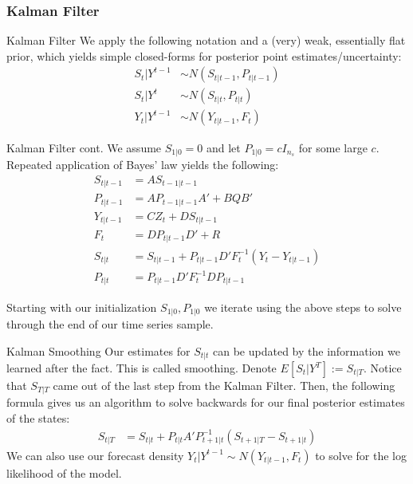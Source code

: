 \documentclass{beamer}
\begin{document}
\subsubsection*{Kalman Filter}
\begin{frame}{Kalman Filter}
We apply the following notation and a (very) weak, essentially flat prior, which yields simple closed-forms for posterior point estimates/uncertainty:
\begin{align*}
S_t|Y^{t-1} &\sim N(S_{t|t-1},P_{t|t-1}) \\
S_t|Y^{t} &\sim N(S_{t|t},P_{t|t})\\
Y_t|Y^{t-1} &\sim N(Y_{t|t-1},F_{t})
\end{align*}
\end{frame}
\begin{frame}{Kalman Filter cont.}
We assume $S_{1|0} = 0$ and let $P_{1|0} = cI_{n_s}$ for some large $c$. Repeated application of Bayes' law yields the following:
\begin{align*}
S_{t|t-1} &= AS_{t-1|t-1} \\
P_{t|t-1} &= A P_{t-1|t-1}A' + B Q B' \\
Y_{t|t-1} &= CZ_t + D S_{t|t-1} \\
F_t &= D P_{t|t-1}D' + R \\
S_{t|t} &= S_{t|t-1} + P_{t|t-1}D'F_t^{-1}(Y_t - Y_{t|t-1})\\
P_{t|t} &= P_{t|t-1}D'F_t^{-1}DP_{t|t-1}
\end{align*}

Starting with our initialization $S_{1|0},P_{1|0}$ we iterate using the above steps to solve through the end of our time series sample.
\end{frame}
\begin{frame}{Kalman Smoothing}
Our estimates for $S_{t|t}$ can be updated by the information we learned after the fact. This is called smoothing. Denote $E[S_t|Y^T]:= S_{t|T}.$ Notice that $S_{T|T}$ came out of the last step from the Kalman Filter. Then, the following formula gives us an algorithm to solve backwards for our final posterior estimates of the states: 
\begin{align*}
S_{t|T} &= S_{t|t} + P_{t|t}A'P_{t+1|t}^{-1}(S_{t+1|T} - S_{t+1|t}) 
\end{align*}
We can also use our forecast density $Y_t|Y^{t-1} \sim N(Y_{t|t-1},F_{t})$ to solve for the log likelihood of the model.
\end{frame}
\end{document}
